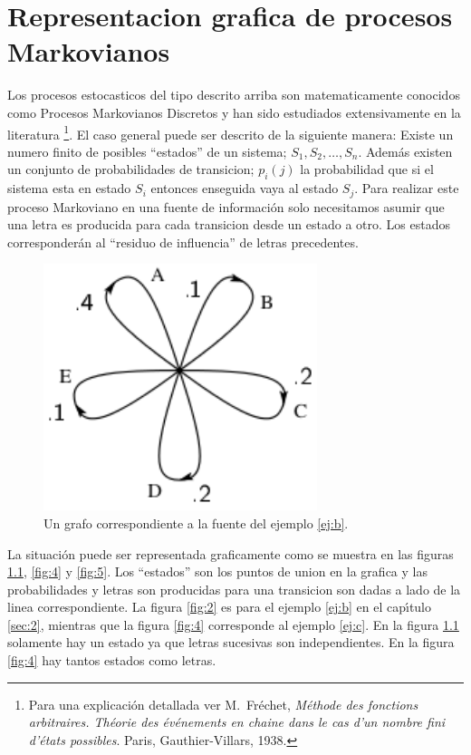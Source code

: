 \chapter{Representacion grafica de procesos Markovianos}
\label{sec:4}

Los procesos estocasticos del tipo descrito arriba son matematicamente
conocidos como Procesos Markovianos Discretos y han sido estudiados
extensivamente en la literatura \footnote{Para una explicaci\'{o}n
  detallada ver M.\ Fr\'{e}chet, {\em M\'{e}thode des fonctions
    arbitraires. Th\'{e}orie des \'{e}v\'{e}nements en chaine dans le
    cas d'un nombre fini d'\'{e}tats possibles}. Paris,
  Gauthier-Villars, 1938.}.  El caso general puede ser descrito de la
siguiente manera: Existe un numero finito de posibles ``estados'' de
un sistema; $S_{1}, S_{2}, \ldots, S_{n}$. Adem\'{a}s existen un
conjunto de probabilidades de transicion; $p_{i}(j)$ la probabilidad
que si el sistema esta en estado $S_{i}$ entonces enseguida vaya al
estado $S_{j}$. Para realizar este proceso Markoviano en una fuente de
informaci\'{o}n solo necesitamos asumir que una letra es producida
para cada transicion desde un estado a otro. Los estados
corresponder\'{a}n al ``residuo de influencia'' de letras precedentes.

\begin{figure}[!ht]
\centerline{\includegraphics[width=80mm]{Imagenes/SinComentarios/Pagina8-Figura3.png}}
\caption{Un grafo correspondiente a la fuente del ejemplo \ref{ej:b}.}
\label{fig:3}
\end{figure}

La situaci\'{o}n puede ser representada graficamente como se muestra
en las figuras \ref{fig:3}, \ref{fig:4} y \ref{fig:5}. Los ``estados''
son los puntos de union en la grafica y las probabilidades y letras
son producidas para una transicion son dadas a lado de la linea
correspondiente. La figura \ref{fig:2} es para el ejemplo \ref{ej:b}
en el cap\'{\i}tulo \ref{sec:2}, mientras que la figura \ref{fig:4}
corresponde al ejemplo \ref{ej:c}. En la figura \ref{fig:3} solamente
hay un estado ya que letras sucesivas son independientes. En la figura
\ref{fig:4} hay tantos estados como letras.

